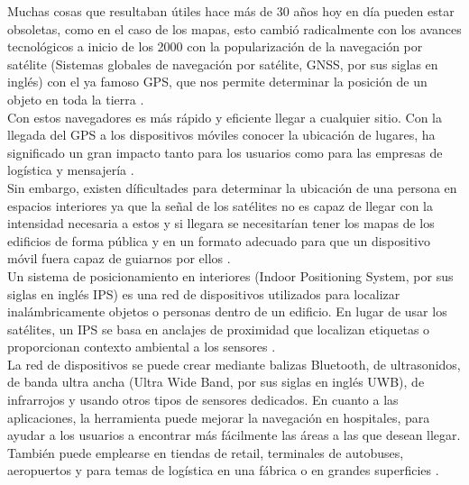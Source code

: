 
Muchas  cosas que resultaban útiles hace más de 30 años hoy en día pueden estar obsoletas, como en el caso de los mapas, esto cambió radicalmente con los avances tecnológicos a inicio de los 2000 con la popularización de la navegación por satélite (Sistemas globales de navegación por satélite, GNSS, por sus siglas en inglés) con el ya famoso GPS, que nos permite determinar la posición de un objeto en toda la tierra \cite{SPIUoc}. \\

Con estos navegadores es más rápido y eficiente llegar a cualquier sitio. Con la llegada del GPS a los dispositivos móviles conocer la ubicación de lugares, ha significado un gran impacto tanto para los usuarios como para las empresas de logística y mensajería \cite{SPIitbs}. \\

Sin embargo, existen díficultades para determinar la ubicación de una persona en espacios interiores ya que la señal de los satélites no es capaz de llegar con la intensidad necesaria a estos y si llegara se necesitarían  tener los mapas de los edificios de forma pública y en un formato adecuado para que un dispositivo móvil fuera capaz de guiarnos por ellos \cite{SPIUoc}. \\

Un sistema de posicionamiento en interiores (Indoor Positioning System, por sus siglas en inglés IPS) es una red de dispositivos utilizados para localizar inalámbricamente objetos o personas dentro de un edificio. En lugar de usar los satélites, un IPS se basa en anclajes de proximidad que localizan etiquetas o proporcionan contexto ambiental a los sensores \cite{SPIDef}. \\

La red de dispositivos se puede crear mediante balizas Bluetooth, de ultrasonidos, de  banda ultra ancha (Ultra Wide Band, por sus siglas en inglés UWB), de infrarrojos y usando otros tipos de sensores dedicados. En cuanto a las aplicaciones, la herramienta puede mejorar la navegación en hospitales, para ayudar a los usuarios a encontrar más fácilmente las áreas a las que desean llegar. También puede emplearse en tiendas de retail, terminales de autobuses, aeropuertos y para temas de logística en una fábrica o en grandes superficies  \cite{SPIitbs}. \\